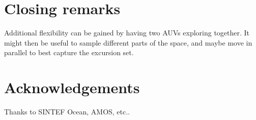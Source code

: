\documentclass[aoas]{imsart}
\begin{document}
\newpage

\section{Closing remarks}\label{sec:concl_disc}

Additional flexibility can be gained by having two AUVs exploring together. It might then be useful to sample different parts of the space, and maybe move in parallel to best capture the excursion set. 

\section*{Acknowledgements}
Thanks to SINTEF Ocean, AMOS, etc..


\footnotesize




\end{document}
